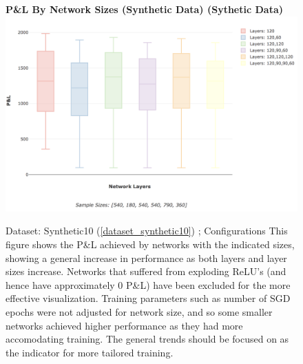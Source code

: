 \documentclass[a4paper,11pt,oneside]{article}
\theoremstyle{plain}
\theoremstyle{definition}
\begin{document}
\begin{figure}[H]
	\centering 
	\textbf{P\&L By Network Sizes (Synthetic Data) (Sythetic Data)}
	\includegraphics[scale=0.3]{images/results/network/synth_pl_box.png} 
	\caption{Dataset: Synthetic10 (\ref{dataset_synthetic10}) ; Configurations 
		\newline This figure shows the P\&L achieved by networks with the indicated sizes, showing a general increase in performance as both layers and layer sizes increase. Networks that suffered from exploding ReLU's (and hence have approximately 0 P\&L) have been excluded for the more effective visualization. Training parameters such as number of SGD epochs were not adjusted for network size, and so some smaller networks achieved higher performance as they had more accomodating training. The general trends should be focused on as the indicator for more tailored training.}
	\label{figure-results_synth_pl_box}
\end{figure}
\end{document}
